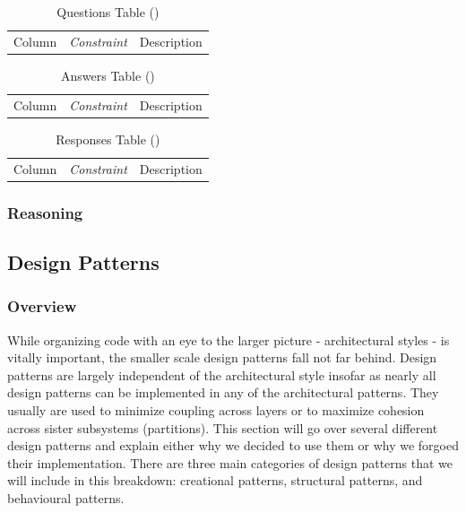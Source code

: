 \documentclass[12pt,letterpaper]{article}
\begin{document}
\begin{table}[H]
	\caption{Questions Table ()} 
	\begin{tabu} to 
		\tableheader{}Column & Constraint & Description \\
	\end{tabu}
\end{table}

\begin{table}[H]
	\caption{Answers Table ()} 
	\begin{tabu} to 
		\tableheader{}Column & Constraint & Description \\
	\end{tabu}
\end{table}

\begin{table}[H]
	\caption{Responses Table ()} 
	\begin{tabu} to 
		\tableheader{}Column & Constraint & Description \\
	\end{tabu}
\end{table}

\subsubsection{Reasoning}
\subsection{Design Patterns}
\subsubsection{Overview}
While organizing code with an eye to the larger picture - architectural styles - is vitally important, the smaller scale design patterns fall not far behind. Design patterns are largely independent of the architectural style insofar as nearly all design patterns can be implemented in any of the architectural patterns. They usually are used to minimize coupling across layers or to maximize cohesion across sister subsystems (partitions). This section will go over several different design patterns and explain either why we decided to use them or why we forgoed their implementation. There are three main categories of design patterns that we will include in this breakdown: creational patterns, structural patterns, and behavioural patterns.
\end{document}
